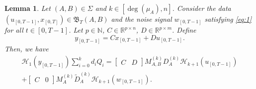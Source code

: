 \documentclass[journal,twoside,web]{ieeecolor}
\newtheorem{lemma}[theorem]{Lemma}
\begin{document}
\begin{lemma}
\label{lem:Omega_Gamma_Theta}
Let $(A,B)\in\Sigma$ and $k\in[\deg(\mu_A),n]$. Consider the data $(u_{[0,T-1]},x_{[0,T]})\in\mathfrak{B}_T(A,B)$ and the noise signal $w_{[0,T-1]}$ satisfying \eqref{eq:1} for all $t\in[0,T-1]$. Let $p\in\mathbb{N}$, $C\in\mathbb{R}^{p\times n}$, $D\in\mathbb{R}^{p\times m}$. Define
\begin{equation}
\label{eq:output_y(t)}
y_{[0,T-1]}=C x_{[0,T-1]} + D u_{[0,T-1]}.
\end{equation}
Then, we have
\begin{equation}
\label{eq:main_identity}
\begin{split}
\mathcal{H}_1(y_{[0,T-1]})\sum_{i=0}^{k}d_iQ_i=\begin{bmatrix}
C & D
\end{bmatrix}M_{A,B}^{(k)}D_A^{(k)}\mathcal{H}_{k+1}(u_{[0,T-1]}) \\ 
+\begin{bmatrix}
C & 0
\end{bmatrix}M_{A}^{(k)}\tilde{D}_A^{(k)}\mathcal{H}_{k+1}(w_{[0,T-1]}).
\end{split}
\end{equation}
\end{lemma}
\end{document}

